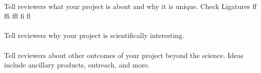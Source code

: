 \\

\noindent Tell reviewers what your project is about and why it is unique. Check Ligatures ff ffi ffl fi fl\\

\\

\noindent Tell reviewers why your project is scientifically interesting.\\

\\

\noindent Tell reviewers about other outcomes of your project beyond the science. Ideas include ancillary products, outreach, and more.
